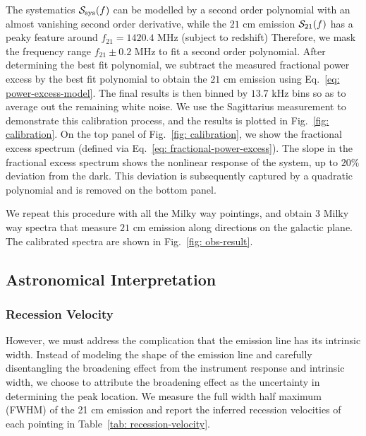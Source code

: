 \documentclass[12pt]{article}
\begin{document}
    The systematics $\mathcal{S}_{\rm sys}(f)$ can be modelled by a second order polynomial with an almost vanishing second order derivative, while the $21$ cm emission $\mathcal{S}_{\rm 21}(f)$ has a peaky feature around $f_{21} = 1420.4$ MHz (subject to redshift)
    Therefore, we mask the frequency range $f_{21} \pm 0.2 $ MHz to fit a second order polynomial.
    After determining the best fit polynomial, we subtract the measured fractional power excess by the best fit polynomial to obtain the $21$ cm emission using Eq.~\ref{eq: power-excess-model}.
    The final results is then binned by $13.7$ kHz bins so as to average out the remaining white noise.
    We use the Sagittarius measurement to demonstrate this calibration process, and the results is plotted in Fig.~\ref{fig: calibration}.
    On the top panel of Fig.~\ref{fig: calibration}, we show the fractional excess spectrum (defined via Eq.~\ref{eq: fractional-power-excess}). 
    The slope in the fractional excess spectrum shows the nonlinear response of the system, up to $20\%$ deviation from the dark. 
    This deviation is subsequently captured by a quadratic polynomial and is removed on the bottom panel.

    We repeat this procedure with all the Milky way pointings, and obtain $3$ Milky way spectra that measure $21$ cm emission along directions on the galactic plane.
    The calibrated spectra are shown in Fig.~\ref{fig: obs-result}.
    
    \subsection{Astronomical Interpretation}
    \subsubsection{Recession Velocity}
    
    However, we must address the complication that the emission line has its intrinsic width. Instead of modeling the shape of the emission line and carefully disentangling the broadening effect from the instrument response and intrinsic width, we choose to attribute the broadening effect as the uncertainty in determining the peak location. We measure the full width half maximum (FWHM) of the 21 cm emission and report the inferred recession velocities of each pointing in Table~\ref{tab: recession-velocity}.
\end{document}
